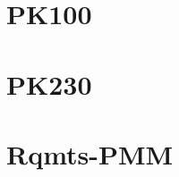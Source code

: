 \documentclass{report}
\begin{document}
\newpage
\section{PK100}


\newpage
\section{PK230}


% 

%
% 
% 
% 
% 
% 
% 
% 
% 
\newpage
\section{Rqmts-PMM}

\end{document}
